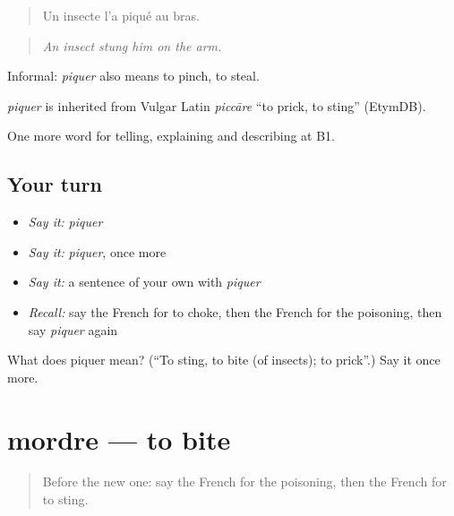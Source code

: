 \begin{quote}
Un insecte l'a piqué au bras.
\end{quote}

\begin{quote}
\emph{An insect stung him on the arm.}
\end{quote}

Informal: \emph{piquer} also means to pinch, to steal.

\begin{cousinweb}
\emph{piquer} is inherited from Vulgar Latin \emph{piccāre} \textquotedblleft{}to prick, to sting\textquotedblright{} (EtymDB).
\end{cousinweb}

\begin{grammarlens}[title={What you've built}]
One more word for telling, explaining and describing at B1.
\end{grammarlens}

\subsection*{Your turn}
\begin{itemize}
\raggedright
  \item \emph{Say it:} \emph{piquer}
  \item \emph{Say it:} \emph{piquer}, once more
  \item \emph{Say it:} a sentence of your own with \emph{piquer}
  \item \emph{Recall:} say the French for to choke, then the French for the poisoning, then say \emph{piquer} again
\end{itemize}

\begin{tcolorbox}[breakable,colback=teal!4,colframe=teal!35!black,title={Before you move on}]
What does piquer mean? (\textquotedblleft{}To sting, to bite (of insects); to prick\textquotedblright{}.) Say it once more.
\end{tcolorbox}
\section[mordre]{mordre — to bite}

\label{lesson:FR-C306-mordre}



\begin{quote}
Before the new one: say the French for the poisoning, then the French for to sting.
\end{quote}

